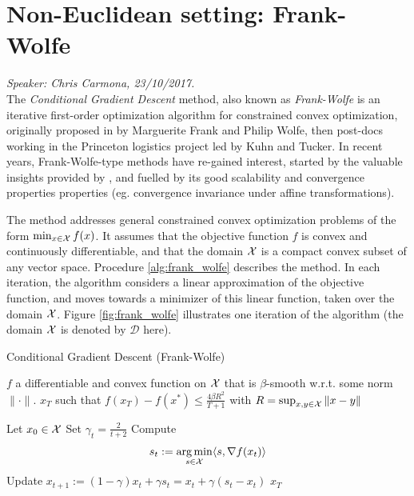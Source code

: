 
\section{Non-Euclidean setting: Frank-Wolfe}
\emph{Speaker: Chris Carmona, 23/10/2017.}\\

The \emph{Conditional Gradient Descent} method, also known as \emph{Frank-Wolfe} is an iterative first-order optimization algorithm for constrained convex optimization, originally proposed in \cite{Frank1956} by Marguerite Frank and Philip Wolfe, then post-docs working in the Princeton logistics project led by Kuhn and Tucker. In recent years, Frank-Wolfe-type methods have re-gained interest, started by the valuable insights provided by \cite{Jaggi2013}, and fuelled by its good scalability and convergence properties properties (eg. convergence invariance under affine transformations).

The method addresses general constrained convex optimization problems of the form $\min_{x \in \mathcal{X}} f(x)$. It assumes that the objective function $f$ is convex and continuously differentiable, and that the domain $\mathcal{X}$ is a compact convex subset of any vector space. Procedure \ref{alg:frank_wolfe} describes the method. In each iteration, the algorithm considers a linear approximation of the objective function, and moves towards a minimizer of this linear function, taken over the domain $\mathcal{X}$. Figure \ref{fig:frank_wolfe} illustrates one iteration of the algorithm (the domain $\mathcal{X}$ is denoted by $\mathcal{D}$ here).

\begin{algorithm}
\caption{Conditional Gradient Descent (Frank-Wolfe)}
   \begin{algorithmic}[1] \label{alg:frank_wolfe}
   \REQUIRE $f$ a differentiable and convex function on $\mathcal{X}$ that is $\beta$-smooth w.r.t. some norm $\|\cdot\|$.
   \ENSURE $x_T$ such that $f(x_T)-f(x^\ast) \leq \frac{4 \beta R^2 }{T+1}$ with $R = \sup_{x,y \in \mathcal{X}} \| x - y\|$
   
   \STATE Let $x_{0} \in \mathcal{X}$
      \STATE Set $\gamma_t=\frac{2}{t+2}$
      \STATE Compute
      \begin{equation} \label{eq:fw_update}
      s_t:= \operatorname*{arg\,min}_{s \in \mathcal{X} } \langle s, \nabla f(x_t) \rangle
      \end{equation}
      \STATE Update $x_{t+1} := (1-\gamma)x_t+ \gamma s_t = x_{t} + \gamma(s_t-x_t)$
   \ENDFOR
    $x_T$
\end{algorithmic}
\end{algorithm}

